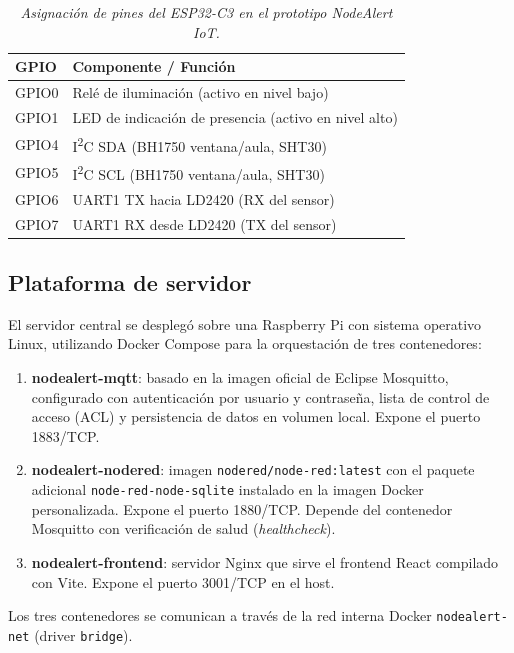 \begin{table}[htbp]
  \centering
  \caption{\textit{Asignación de pines del ESP32-C3 en el prototipo NodeAlert IoT.}}
  \label{tab:pinout}
  \begin{tabularx}{\textwidth}{l X}
    \toprule
    \textbf{GPIO} & \textbf{Componente / Función} \\
    \midrule
    GPIO0 & Relé de iluminación (activo en nivel bajo) \\
    GPIO1 & LED de indicación de presencia (activo en nivel alto) \\
    GPIO4 & I\textsuperscript{2}C SDA (BH1750 ventana/aula, SHT30) \\
    GPIO5 & I\textsuperscript{2}C SCL (BH1750 ventana/aula, SHT30) \\
    GPIO6 & UART1 TX hacia LD2420 (RX del sensor) \\
    GPIO7 & UART1 RX desde LD2420 (TX del sensor) \\
    \bottomrule
  \end{tabularx}
\end{table}

\subsection{Plataforma de servidor}

El servidor central se desplegó sobre una Raspberry Pi con sistema operativo Linux,
utilizando Docker Compose para la orquestación de tres contenedores:

\begin{enumerate}
  \item \textbf{nodealert-mqtt}: basado en la imagen oficial de Eclipse Mosquitto,
        configurado con autenticación por usuario y contraseña, lista de control
        de acceso (ACL) y persistencia de datos en volumen local. Expone el puerto
        1883/TCP.
  \item \textbf{nodealert-nodered}: imagen \texttt{nodered/node-red:latest}
        con el paquete adicional \texttt{node-red-node-sqlite} instalado en la
        imagen Docker personalizada. Expone el puerto 1880/TCP. Depende del
        contenedor Mosquitto con verificación de salud (\textit{healthcheck}).
  \item \textbf{nodealert-frontend}: servidor Nginx que sirve el frontend React
        compilado con Vite. Expone el puerto 3001/TCP en el host.
\end{enumerate}

Los tres contenedores se comunican a través de la red interna Docker
\texttt{nodealert-net} (driver \texttt{bridge}).

